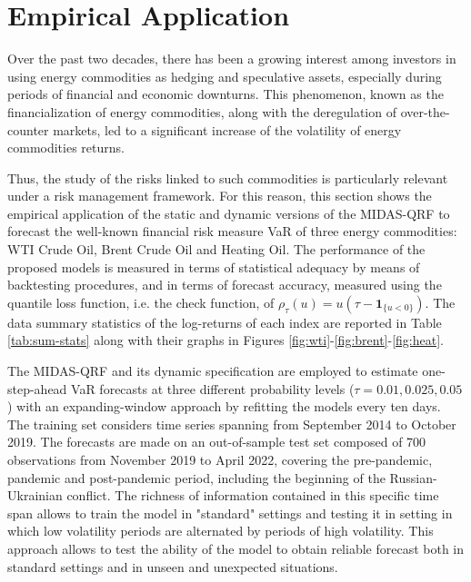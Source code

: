 \section{Empirical Application} \label{sec:MIDAS-QRF-empirical}

Over the past two decades, there has been a growing interest among investors in using energy commodities as hedging and speculative assets, especially during periods of financial and economic downturns. This phenomenon, known as the financialization of energy commodities, along with the deregulation of over-the-counter markets, led to a significant increase of the volatility of energy commodities returns. 
\vspace{0.15in}

\noindent Thus, the study of the risks linked to such commodities is particularly relevant under a risk management framework. 
For this reason, this section shows the empirical application of the static and dynamic versions of the MIDAS-QRF to forecast the well-known financial risk measure VaR of three energy commodities: WTI Crude Oil, Brent Crude Oil and Heating Oil.
The performance of the proposed models is measured in terms of statistical adequacy by means of backtesting procedures, and in terms of forecast accuracy, measured using the quantile loss function, i.e. the check function, of \cite{koenker1978regression} $\rho_\tau(u)=u(\tau-\mathbf{1}_{\{u<0\}})$. The data summary statistics of the log-returns of each index are reported in Table \ref{tab:sum-stats} along with their graphs in Figures \ref{fig:wti}-\ref{fig:brent}-\ref{fig:heat}.


\vspace{0.15in}

\noindent The MIDAS-QRF and its dynamic specification are employed to estimate one-step-ahead VaR forecasts at three different probability levels ($\tau=0.01, 0.025, 0.05$) with an expanding-window approach by refitting the models every ten days.
The training set considers time series spanning from September 2014 to October 2019. The forecasts are made on an out-of-sample test set composed of 700 observations from November 2019 to April 2022, covering the pre-pandemic, pandemic and post-pandemic period, including the beginning of the Russian-Ukrainian conflict. The richness of information contained in this specific time span allows to train the model in "standard" settings and testing it in setting in which low volatility periods are alternated by periods of high volatility. This approach allows to test the ability of the model to obtain reliable forecast both in standard settings and in unseen and unexpected situations.

